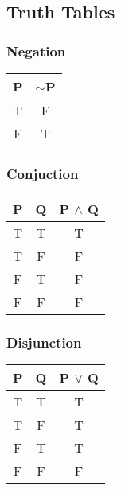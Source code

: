 \newpage

\subsection{Truth Tables}

\begin{multicols}{2}

\subsubsection{Negation}

\begin{table}[H]
\centering
\begin{tabular}[t]{|c|c|}
\hline
\textbf{P} & \textbf{$\sim$P} \\ \hline
T & F \\ \hline
F & T \\ \hline
\end{tabular}
\end{table}

\subsubsection{Conjuction}

\begin{table}[H]
\centering
\begin{tabular}[t]{|c|c|c|}
\hline
\textbf{P} & \textbf{Q} & \textbf{P $\land$ Q} \\ \hline
T & T & T \\ \hline
T & F & F \\ \hline
F & T & F \\ \hline
F & F & F \\ \hline
\end{tabular}
\end{table}

\subsubsection{Disjunction}

\begin{table}[H]
\centering
\begin{tabular}[t]{|c|c|c|}
\hline
\textbf{P} & \textbf{Q} & \textbf{P $\lor$ Q} \\ \hline
T & T & T \\ \hline
T & F & T \\ \hline
F & T & T \\ \hline
F & F & F \\ \hline
\end{tabular}
\end{table}


\end{multicols}
